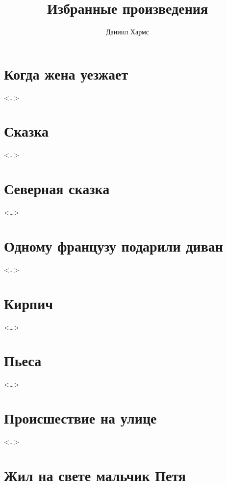 \documentclass[a4paper,12pt]{book}
\title{Избранные произведения}
\author{Даниил Хармс}
\date{}
\newcommand{\storyend}{\begin{flushright}<\dots>\end{flushright}}
\begin{document}
\maketitle
\tableofcontents

\chapter{Когда жена уезжает}

\storyend

\chapter{Сказка}

\storyend

\chapter{Северная сказка}

\storyend

\chapter{Одному французу подарили диван}

\storyend

\chapter{Кирпич}

\storyend

\chapter{Пьеса}

\storyend

\chapter{Происшествие на улице}

\storyend

\chapter{Жил на свете мальчик Петя}

\end{document}
